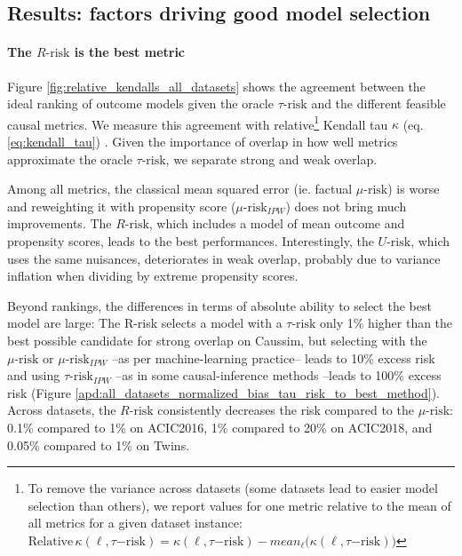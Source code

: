 \documentclass[10pt,twocolumn]{article}
\begin{document}
\subsection{Results: factors driving good model selection}\label{empirical_study:results}


\paragraph{The $R\text{-risk}$ is the best metric}

Figure \ref{fig:relative_kendalls_all_datasets} shows the agreement between the
ideal ranking of outcome models given the oracle $\tau\text{-risk}$ and the different
feasible causal metrics. We measure this agreement with relative\footnote{To
    remove the variance across datasets (some datasets lead to easier model
    selection than others), we report values for one metric relative to the mean of
    all metrics for a given dataset instance: $\text{Relative} \,
        \kappa(\ell,\tau\mathrm{{-risk}})= \kappa(\ell,\tau\mathrm{{-risk}}) -
        mean_{\ell}\big(\kappa(\ell,\tau\mathrm{{-risk}})\big)$} Kendall tau $\kappa$
(eq. \ref{eq:kendall_tau}) \cite{kendall_new_1938}. Given the importance of
overlap in how well metrics approximate the oracle $\tau\text{-risk}$, we
separate strong and weak overlap.

Among all metrics, the classical mean squared error (ie. factual
$\mu\text{-risk}$) is worse and reweighting it with propensity score
($\mu\text{-risk}_{IPW}$) does not bring much improvements. The
$R\text{-risk}$, which includes a model of mean outcome and propensity
scores, leads to the best performances. Interestingly, the
$U\text{-risk}$, which uses the same nuisances, deteriorates in weak overlap, probably due to variance
inflation when dividing by extreme propensity scores.

Beyond rankings, the differences in terms of absolute
ability to select the best model are large: The R-risk selects a model
with a $\tau\text{-risk}$ only 1\% higher
than the best
possible candidate for strong overlap on Caussim, but selecting with
the $\mu\text{-risk}$ or $\mu\text{-risk}_{IPW}$ --as per machine-learning
practice-- leads to 10\% excess risk and using $\tau\text{-risk}_{IPW}$
--as in some causal-inference methods \citep{athey2016recursive,gutierrez_causal_2016}--leads to 100\% excess risk
(Figure
\ref{apd:all_datasets_normalized_bias_tau_risk_to_best_method}). Across
datasets, the $R\text{-risk}$ consistently decreases the
risk compared to the $\mu\text{-risk}$:
0.1\% compared to 1\% on ACIC2016,  1\% compared to 20\% on ACIC2018,
and 0.05\% compared to 1\% on Twins.
\end{document}
